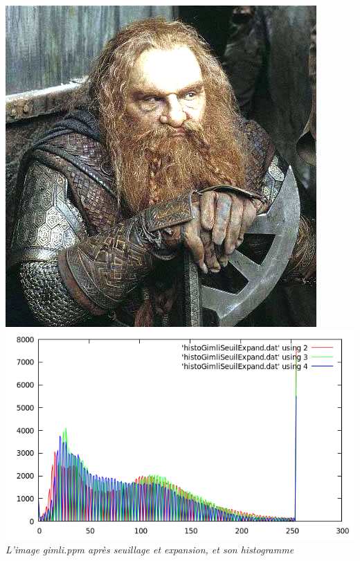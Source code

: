 \documentclass[a4paper,11pt]{article}
\begin{document}
\begin{center}
\includegraphics[scale=0.5]{gimliseuilexpand.png}
\includegraphics[scale=0.5]{histoGimliSeuilExpand.png}\\
\textit{L'image gimli.ppm après seuillage et expansion, et son histogramme}
\end{center}

\newpage
\end{document}
